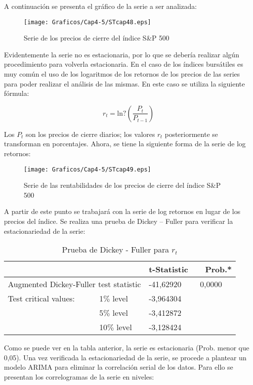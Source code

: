 A continuaci\'{o}n se presenta el gr\'{a}fico de la serie a ser analizada:

\begin{figure}[H]
\centering
\texttt{[image: Graficos/Cap4-5/STcap48.eps]}
\caption{Serie de los precios de cierre del \'{i}ndice S{\&}P 500}
\end{figure}

Evidentemente la serie no es estacionaria, por lo que se deber\'{i}a realizar alg\'{u}n procedimiento para volverla estacionaria. En el caso de los \'{i}ndices burs\'{a}tiles es muy com\'{u}n el uso de los logaritmos de los retornos de los precios de las series para poder realizar el an\'{a}lisis de las mismas. En este caso se utiliza la siguiente f\'{o}rmula:

\[
r_{t}=\mathrm{ln?}\left( \frac{P_{t}}{P_{t-1}} \right)
\]

Los $P_{t}$ son los precios de cierre diarios; los valores $r_{t}$ posteriormente se transforman en porcentajes. Ahora, se tiene la siguiente forma de la serie de log retornos:

\begin{figure}[H]
\centering
\texttt{[image: Graficos/Cap4-5/STcap49.eps]}
\caption{Serie de las rentabilidades de los precios de cierre del \'{i}ndice S{\&}P 500}
\end{figure}

A partir de este punto se trabajar\'{a} con la serie de log retornos en lugar de los precios del \'{i}ndice. Se realiza una prueba de Dickey -- Fuller para verificar la estacionariedad de la serie:

\begin{table}[H]
\centering
\begin{tabular}{p{110pt}p{70pt}ll}\hline\hline
& & t-Statistic & ~~Prob.* \\ \hline \hline
\multicolumn{2}{l}{Augmented Dickey-Fuller test statistic} & -41,62920 & ~0,0000 \\ \hline
Test critical values: & 1$\%$ level & -3,964304 & \\
& 5$\%$ level & -3,412872 & \\
& 10$\%$ level & -3,128424 & \\ \hline \hline
\end{tabular}
\caption{Prueba de Dickey - Fuller para $r_t$}
\end{table}

Como se puede ver en la tabla anterior, la serie es estacionaria (Prob. menor que 0,05). Una vez verificada la estacionariedad de la serie, se procede a plantear un modelo ARIMA para eliminar la correlaci\'{o}n serial de los datos. Para ello se presentan los correlogramas de la serie en niveles:

